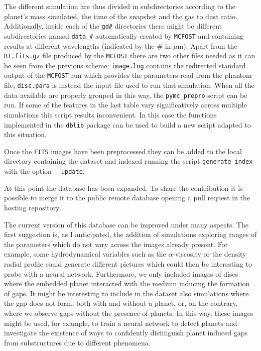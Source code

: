 \documentclass[a4paper,10pt]{report}
\begin{document}
The different simulation are thus divided in subdirectories according to the planet's mass simulated, the time of the
snapshot and the gas to dust ratio. Additionally, inside each of the \lstinline{gd#} directories 
there might be different subdirectories named \lstinline{data_#} automatically created by \lstinline{MCFOST} 
and containing results at different wavelengths (indicated by the \# in $\mu$m).
Apart from the \lstinline{RT.fits.gz} file produced by the \lstinline{MCFOST} there are two other files needed as it can be seen
from the previous scheme: \lstinline{image.log} contains the redirected standard output of the \lstinline{MCFOST} run which 
provides the parameters read from the phantom file,
\lstinline{disc.para} is instead the input file used to run that simulation.
When all the data available are properly grouped in this way, the \lstinline{pymc_prepro} script
can be run. If some of the features in the last table vary significatively across multiple simulations this script 
results inconvenient. In this case the functions implemented in the \lstinline{dblib} package can be used
to build a new script adapted to
this situation.

Once the \lstinline{FITS} images have been preprocessed they can be added to the local directory containing the dataset 
and indexed running the script \lstinline{generate_index} with the option \lstinline{--update}. 

At this point the database has been expanded. To share the contribution it is possible to merge it to the public remote database
opening a pull request in the hosting repository. 

The current version of this database can be improved under many aspects. The first suggestion
is, as I anticipated, the addition of simulations exploring ranges of the parameters which do not vary across the images already present.
For example, some hydrodynamical variables such as the $\alpha$-viscosity 
or the density radial profile could generate different pictures which could then be interesting to probe with a neural network.
Furthermore, we only included images of discs where the embedded planet interacted with the medium inducing the formation of
gaps. It might be interesting to include in the dataset also simulations where the gap does
not form, both with and without a planet, or, on the contrary, where we observe gaps without the presence of planets.
In this way, these images might be used, for example, to train a neural network to detect planets and investigate
the existence of ways to confidently distinguish planet induced gaps from substructures due to different phenomena. 
\end{document}
